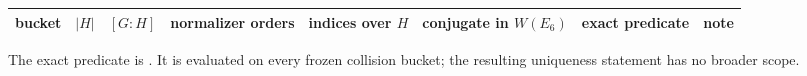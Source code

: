 \begingroup
\scriptsize
\setlength{\tabcolsep}{3.6pt}
\renewcommand{\arraystretch}{1.10}
\begin{adjustbox}{max width=\textwidth}
\begin{tabular}{@{}crrrrrrc@{}}
\toprule
bucket & $|H|$ & $[G:H]$ & normalizer orders & indices over $H$ & conjugate in $W(E_6)$ & exact predicate & note \\
\midrule
%
\end{tabular}
\end{adjustbox}
\par\smallskip
\footnotesize The exact predicate is \CsiPredicate.  It is evaluated on every
frozen collision bucket; the resulting uniqueness statement has no broader
scope.
\endgroup
